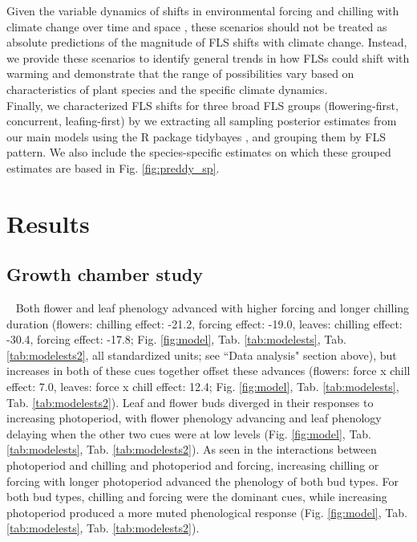 \documentclass[11pt]{article}\usepackage[]{graphicx}\usepackage[]{color}
\begin{document}
\noindent Given the variable dynamics of shifts in environmental forcing and chilling with climate change over time and space \citep{Luedeling:2011aa}, these scenarios should not be treated as absolute predictions of the magnitude of FLS shifts with climate change. Instead, we provide these scenarios to identify general trends in how FLSs could shift with warming and demonstrate that the range of possibilities vary based on characteristics of plant species and the specific climate dynamics.\\

\noindent Finally, we characterized FLS shifts for three broad FLS groups (flowering-first, concurrent, leafing-first) by we extracting all sampling posterior estimates from our main models using the R package tidybayes \citep{Kay2020}, and grouping them by FLS pattern. We also include the species-specific estimates on which these grouped estimates are based in Fig. \ref{fig:preddy_sp}.  \\ 

\section*{Results} 
\subsection*{Growth chamber study} \
\noindent  Both flower and leaf phenology advanced with higher forcing and longer chilling duration (flowers: chilling effect: -21.2, forcing effect: -19.0, leaves: chilling effect: -30.4, forcing effect: -17.8; Fig. \ref{fig:model}, Tab. \ref{tab:modelests}, Tab. \ref{tab:modelests2}, all standardized units; see ``Data analysis" section above), but increases in both of these cues together offset these advances (flowers: force x chill effect: 7.0, leaves: force x chill effect: 12.4; Fig. \ref{fig:model}, Tab. \ref{tab:modelests}, Tab. \ref{tab:modelests2}). Leaf and flower buds diverged in their responses to increasing photoperiod, with flower phenology advancing and leaf phenology  delaying when the other two cues were at low levels (Fig. \ref{fig:model}, Tab. \ref{tab:modelests}, Tab. \ref{tab:modelests2}). As seen in the interactions between photoperiod and chilling and photoperiod and forcing, increasing chilling or forcing with longer photoperiod advanced the phenology of both bud types. For both bud types, chilling and forcing were the dominant cues, while increasing photoperiod produced a more muted phenological response (Fig. \ref{fig:model}, Tab. \ref{tab:modelests}, Tab. \ref{tab:modelests2}). \\
\end{document}
